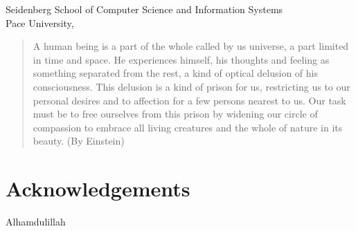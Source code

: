 \documentclass[]{article}
\begin{document}
\vspace{4.5cm}  %

\begin{flushleft}
Seidenberg School of Computer Science and Information Systems
\\
Pace University, \date{February 2019}
\end{flushleft}





\newpage
{ %

\begin{abstract}
\large
A human being is a part of the whole called by us universe, a part
limited in time and space. He experiences himself, his thoughts and
feeling as something separated from the rest, a kind of optical delusion
of his consciousness. This delusion is a kind of prison for us,
restricting us to our personal desires and to affection for a few
persons nearest to us. Our task must be to free ourselves from this
prison by widening our circle of compassion to embrace all living
creatures and the whole of nature in its beauty. (By Einstein)
\end{abstract}
}
\newpage

\section*{\centering Acknowledgements}
\begin{center}
Alhamdulillah
\end{center}


{
\newpage
\setcounter{tocdepth}{3}
\tableofcontents
\newpage
\listoftables
\newpage
\listoffigures
\newpage

}

\rhead{\thepage} %
\lhead[LO]{\leftmark} %
\cfoot{}
\lfoot{} %
\rfoot{} %
\setcounter{page}{1}
\doublespacing %
\end{document}
